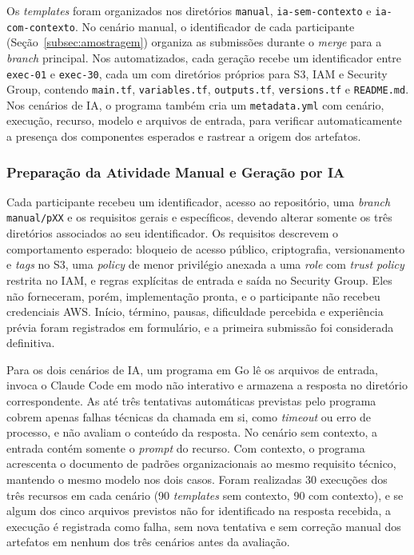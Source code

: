 Os \textit{templates} foram organizados nos diretórios \texttt{manual}, \texttt{ia-sem-contexto} e \texttt{ia-com-contexto}. No cenário manual, o identificador de cada participante (Seção~\ref{subsec:amostragem}) organiza as submissões durante o \textit{merge} para a \textit{branch} principal. Nos automatizados, cada geração recebe um identificador entre \texttt{exec-01} e \texttt{exec-30}, cada um com diretórios próprios para S3, IAM e Security Group, contendo \texttt{main.tf}, \texttt{variables.tf}, \texttt{outputs.tf}, \texttt{versions.tf} e \texttt{README.md}. Nos cenários de IA, o programa também cria um \texttt{metadata.yml} com cenário, execução, recurso, modelo e arquivos de entrada, para verificar automaticamente a presença dos componentes esperados e rastrear a origem dos artefatos.

\subsubsection{Preparação da Atividade Manual e Geração por IA}

Cada participante recebeu um identificador, acesso ao repositório, uma \textit{branch} \texttt{manual/pXX} e os requisitos gerais e específicos, devendo alterar somente os três diretórios associados ao seu identificador. Os requisitos descrevem o comportamento esperado: bloqueio de acesso público, criptografia, versionamento e \textit{tags} no S3, uma \textit{policy} de menor privilégio anexada a uma \textit{role} com \textit{trust policy} restrita no IAM, e regras explícitas de entrada e saída no Security Group. Eles não forneceram, porém, implementação pronta, e o participante não recebeu credenciais AWS. Início, término, pausas, dificuldade percebida e experiência prévia foram registrados em formulário, e a primeira submissão foi considerada definitiva.

Para os dois cenários de IA, um programa em Go lê os arquivos de entrada, invoca o Claude Code em modo não interativo e armazena a resposta no diretório correspondente. As até três tentativas automáticas previstas pelo programa cobrem apenas falhas técnicas da chamada em si, como \textit{timeout} ou erro de processo, e não avaliam o conteúdo da resposta. No cenário sem contexto, a entrada contém somente o \textit{prompt} do recurso. Com contexto, o programa acrescenta o documento de padrões organizacionais ao mesmo requisito técnico, mantendo o mesmo modelo nos dois casos. Foram realizadas 30 execuções dos três recursos em cada cenário (90 \textit{templates} sem contexto, 90 com contexto), e se algum dos cinco arquivos previstos não for identificado na resposta recebida, a execução é registrada como falha, sem nova tentativa e sem correção manual dos artefatos em nenhum dos três cenários antes da avaliação.

